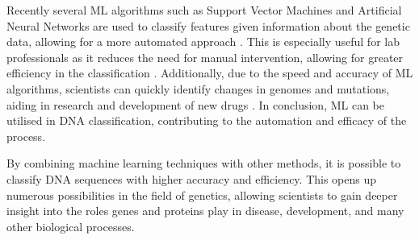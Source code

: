 Recently several ML algorithms such as Support Vector Machines and Artificial Neural Networks are used to classify features given information about the genetic data, allowing for a more automated approach \cite{kalender2020}. This is especially useful for lab professionals as it reduces the need for manual intervention, allowing for greater efficiency in the classification \cite{vihar2019}. Additionally, due to the speed and accuracy of ML algorithms, scientists can quickly identify changes in genomes and mutations, aiding in research and development of new drugs \cite{neto2021}. In conclusion, ML can be utilised in DNA classification, contributing to the automation and efficacy of the process.

By combining machine learning techniques with other methods, it is possible to classify DNA sequences with higher accuracy and efficiency. This opens up numerous possibilities in the field of genetics, allowing scientists to gain deeper insight into the roles genes and proteins play in disease, development, and many other biological processes.

 


